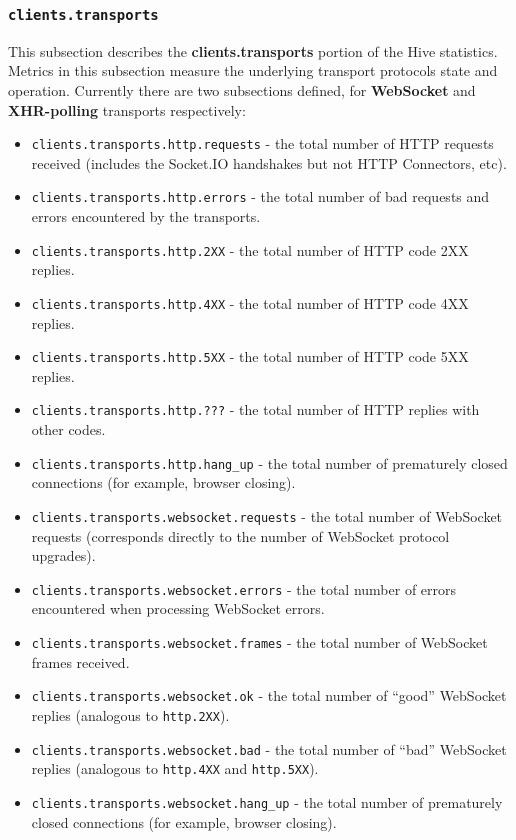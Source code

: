 \documentclass[a4paper]{article}
\begin{document}
\subsubsection{\texttt{clients.transports}}
\label{sec-4-2-9}

This subsection describes the \textbf{clients.transports} portion of the Hive statistics. Metrics in this subsection measure the underlying transport protocols state and operation. Currently there are two subsections defined, for \textbf{WebSocket} and \textbf{XHR-polling} transports respectively:


\begin{itemize}
\item \texttt{clients.transports.http.requests} - the total number of HTTP requests received (includes the Socket.IO handshakes but not HTTP Connectors, etc).
\item \texttt{clients.transports.http.errors} - the total number of bad requests and errors encountered by the transports.
\item \texttt{clients.transports.http.2XX} - the total number of HTTP code 2XX replies.
\item \texttt{clients.transports.http.4XX} - the total number of HTTP code 4XX replies.
\item \texttt{clients.transports.http.5XX} - the total number of HTTP code 5XX replies.
\item \texttt{clients.transports.http.???} - the total number of HTTP replies with other codes.
\item \texttt{clients.transports.http.hang\_up} - the total number of prematurely closed connections (for example, browser closing).
\item \texttt{clients.transports.websocket.requests} - the total number of WebSocket requests (corresponds directly to the number of WebSocket protocol upgrades).
\item \texttt{clients.transports.websocket.errors} - the total number of errors encountered when processing WebSocket errors.
\item \texttt{clients.transports.websocket.frames} - the total number of WebSocket frames received.
\item \texttt{clients.transports.websocket.ok} - the total number of ``good'' WebSocket replies (analogous to \texttt{http.2XX}).
\item \texttt{clients.transports.websocket.bad} - the total number of ``bad'' WebSocket replies (analogous to \texttt{http.4XX} and \texttt{http.5XX}).
\item \texttt{clients.transports.websocket.hang\_up} - the total number of prematurely closed connections (for example, browser closing).
\end{itemize}
\end{document}
